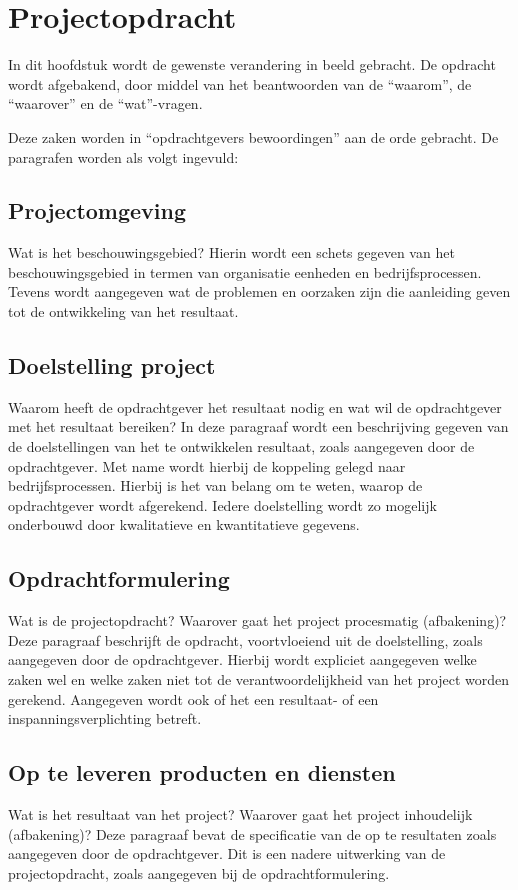 \section{Projectopdracht}
\label{projectopdracht}

In dit hoofdstuk wordt de gewenste verandering in beeld gebracht.
De opdracht wordt afgebakend, door middel van het beantwoorden van de ``waarom'', de ``waarover'' en de ``wat''-vragen.

Deze zaken worden in ``opdrachtgevers bewoordingen'' aan de orde gebracht.
De paragrafen worden als volgt ingevuld:

\subsection{Projectomgeving}
Wat is het beschouwingsgebied?
Hierin wordt een schets gegeven van het beschouwingsgebied in termen van organisatie eenheden en bedrijfsprocessen.
Tevens wordt aangegeven wat de problemen en oorzaken zijn die aanleiding geven tot de ontwikkeling van het resultaat.


\subsection{Doelstelling project}
Waarom heeft de opdrachtgever het resultaat nodig en wat wil de opdrachtgever met het resultaat bereiken?
In deze paragraaf wordt een beschrijving gegeven van de doelstellingen van het te ontwikkelen resultaat,
zoals aangegeven door de opdrachtgever.
Met name wordt hierbij de koppeling gelegd naar bedrijfsprocessen.
Hierbij is het van belang om te weten, waarop de opdrachtgever wordt afgerekend.
Iedere doelstelling wordt zo mogelijk onderbouwd door kwalitatieve en kwantitatieve gegevens.

\subsection{Opdrachtformulering}
Wat is de projectopdracht?
Waarover gaat het project procesmatig (afbakening)?
Deze paragraaf beschrijft de opdracht, voortvloeiend uit de doelstelling, zoals aangegeven door de opdrachtgever.
Hierbij wordt expliciet aangegeven welke zaken wel en welke zaken niet tot de verantwoordelijkheid van het project worden gerekend.
Aangegeven wordt ook of het een resultaat- of een inspanningsverplichting betreft.

\subsection{Op te leveren producten en diensten}
Wat is het resultaat van het project?
Waarover gaat het project inhoudelijk (afbakening)?
Deze paragraaf bevat de specificatie van de op te resultaten zoals aangegeven door de opdrachtgever.
Dit is een nadere uitwerking van de projectopdracht, zoals aangegeven bij de opdrachtformulering.

